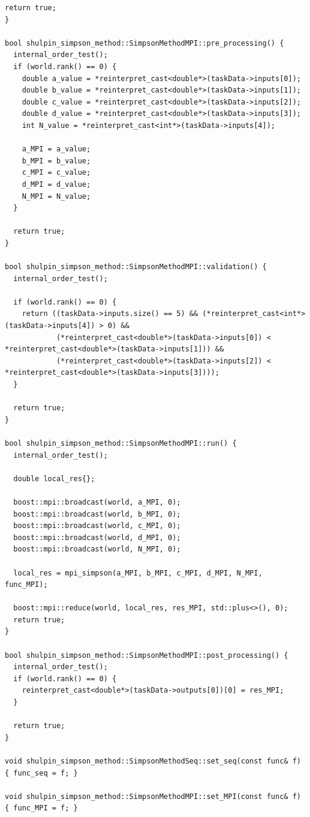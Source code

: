 \documentclass[12pt,a4paper]{article}
\begin{document}
\begin{lstlisting}[caption={simpson\_method.cpp}]
  return true;
}

bool shulpin_simpson_method::SimpsonMethodMPI::pre_processing() {
  internal_order_test();
  if (world.rank() == 0) {
    double a_value = *reinterpret_cast<double*>(taskData->inputs[0]);
    double b_value = *reinterpret_cast<double*>(taskData->inputs[1]);
    double c_value = *reinterpret_cast<double*>(taskData->inputs[2]);
    double d_value = *reinterpret_cast<double*>(taskData->inputs[3]);
    int N_value = *reinterpret_cast<int*>(taskData->inputs[4]);

    a_MPI = a_value;
    b_MPI = b_value;
    c_MPI = c_value;
    d_MPI = d_value;
    N_MPI = N_value;
  }

  return true;
}

bool shulpin_simpson_method::SimpsonMethodMPI::validation() {
  internal_order_test();

  if (world.rank() == 0) {
    return ((taskData->inputs.size() == 5) && (*reinterpret_cast<int*>(taskData->inputs[4]) > 0) &&
            (*reinterpret_cast<double*>(taskData->inputs[0]) < *reinterpret_cast<double*>(taskData->inputs[1])) &&
            (*reinterpret_cast<double*>(taskData->inputs[2]) < *reinterpret_cast<double*>(taskData->inputs[3])));
  }

  return true;
}

bool shulpin_simpson_method::SimpsonMethodMPI::run() {
  internal_order_test();

  double local_res{};

  boost::mpi::broadcast(world, a_MPI, 0);
  boost::mpi::broadcast(world, b_MPI, 0);
  boost::mpi::broadcast(world, c_MPI, 0);
  boost::mpi::broadcast(world, d_MPI, 0);
  boost::mpi::broadcast(world, N_MPI, 0);

  local_res = mpi_simpson(a_MPI, b_MPI, c_MPI, d_MPI, N_MPI, func_MPI);

  boost::mpi::reduce(world, local_res, res_MPI, std::plus<>(), 0);
  return true;
}

bool shulpin_simpson_method::SimpsonMethodMPI::post_processing() {
  internal_order_test();
  if (world.rank() == 0) {
    reinterpret_cast<double*>(taskData->outputs[0])[0] = res_MPI;
  }

  return true;
}

void shulpin_simpson_method::SimpsonMethodSeq::set_seq(const func& f) { func_seq = f; }

void shulpin_simpson_method::SimpsonMethodMPI::set_MPI(const func& f) { func_MPI = f; }
\end{lstlisting}
\end{document}
